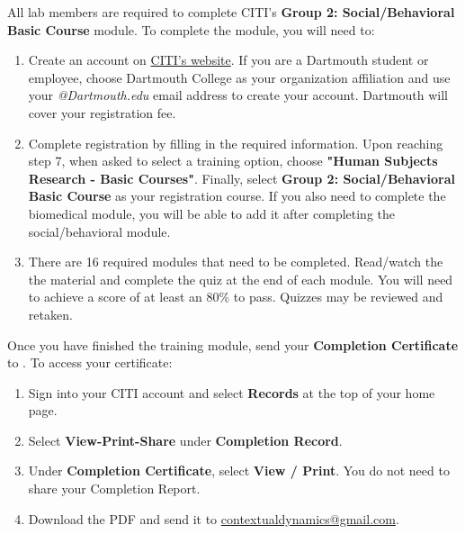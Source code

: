 \documentclass{tufte-book} %
\begin{document}
\noindent All lab members are required to complete CITI's \textbf{Group 2: Social/Behavioral 
Basic Course} module.  To complete the module, you will need to:
\begin{enumerate}
\item Create an account on \href{https://about.citiprogram.org}{CITI's website}.
    If you are a Dartmouth student or employee, choose Dartmouth College as your
    organization affiliation and use your \textit{@Dartmouth.edu} email address to create
    your account.  Dartmouth will cover your registration fee.
\item Complete registration by filling in the required information. Upon reaching step 7, when asked to select a training option, choose \textbf{"Human Subjects Research - Basic Courses"}. Finally, select \textbf{Group 2: Social/Behavioral Basic Course} as your registration course.
    If you also need to complete the biomedical module, you will be able to add it
    after completing the social/behavioral module.
\item There are 16 required modules that need to be completed. Read/watch the the material and complete the quiz at the end of each module. You will need to achieve a score of at least an 80\% to pass. Quizzes may be reviewed and retaken.
\end{enumerate}

\noindent Once you have finished the training module, send your \textbf{Completion
Certificate} to \coordinator.  To access your certificate:
\begin{enumerate}
\item Sign into your CITI account and select \textbf{Records} at the top of your 
    home page.
\item Select \textbf{View-Print-Share} under \textbf{Completion Record}.
\item Under \textbf{Completion Certificate}, select \textbf{View / Print}.  You do not need to
    share your Completion Report.
\item Download the PDF and send it to \href{mailto:contextualdynamics@gmail.com}
    {contextualdynamics@gmail.com}.
\end{enumerate}
\end{document}
